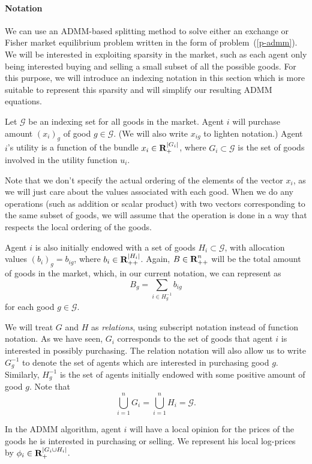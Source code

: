 \documentclass[12pt]{article}
\begin{document}
\paragraph{Notation}

We can use an ADMM-based splitting method \cite{boyd2011distributed} to solve
either an exchange or Fisher market equilibrium problem written in the form of
problem~(\ref{p-admm}). We will be interested in exploiting sparsity in the
market, such as each agent only being interested buying and selling a small
subset  of all the possible goods. For this purpose, we will introduce an
indexing notation in this section which is more suitable to represent this
sparsity and will simplify our resulting ADMM equations.

Let $\mathcal{G}$ be an indexing set for all goods
in the market.
Agent $i$ will purchase amount $(x_i)_g$ of good $g \in \mathcal{G}$.
(We will also write $x_{ig}$ to lighten notation.)
Agent $i$'s utility is a function of the bundle $x_i \in {\mbox{\bf R}}_{+}^{|G_i|}$,
where $G_i \subset \mathcal{G}$ is the set of goods involved in the utility
function $u_i$.

Note that we don't specify the actual ordering of the elements
of the vector $x_i$, as we will just care about the values associated with
each good.
When we do any operations (such as addition or scalar product) with
two vectors corresponding to the same subset of goods, we will
assume that the operation is done in a way that respects the local ordering of
the goods.

Agent $i$ is also initially endowed with a set of goods
$H_i \subset \mathcal{G}$,
with allocation values $(b_i)_g = b_{ig}$, where $b_i \in {\mbox{\bf R}}_{++}^{|H_i|}$.
Again, $B \in {\mbox{\bf R}}^n_{++}$ will be the total amount of goods in the market,
which, in our current notation, we can represent as
\[
B_g = \sum\limits_{i \in H^{-1}_g} b_{ig}
\]
for each good $g \in \mathcal{G}$.

We will treat $G$ and $H$ as \emph{relations}, using subscript notation instead
of function notation. As we have seen, $G_i$ corresponds to the set of goods
that agent $i$ is interested in possibly purchasing. The relation notation will
also allow us to write $G^{-1}_g$ to denote the set of agents which are
interested in purchasing good $g$. Similarly, $H^{-1}_g$ is the set of agents
initially endowed with some positive amount of good $g$. Note that
\[
\bigcup_{i=1}^n G_i = \bigcup_{i=1}^n H_i = \mathcal{G}.
\]

In the ADMM algorithm, agent $i$ will have a local opinion for the prices
of the goods he is interested in purchasing or selling.
We represent his local log-prices
by $\phi_i \in {\mbox{\bf R}}_+^{|G_i \cup H_i|}$.
\end{document}
